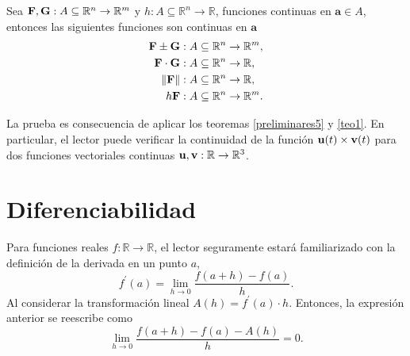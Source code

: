 \begin{teorema}
  Sea $\mathbf{F},\mathbf{G}:A\subseteq \mathbb{R}^n\to \mathbb{R}^m$ y $h:A\subseteq \mathbb{R}^n\to \mathbb{R}$,
  funciones continuas en $\mathbf{a}\in A$, entonces las siguientes funciones son continuas en $\mathbf{a}$
  \begin{align*}
    \mathbf{F}\pm \mathbf{G}:A\subseteq \mathbb{R}^n &\to \mathbb{R}^m, \\
    \mathbf{F}\cdot \mathbf{G}:A\subseteq \mathbb{R}^n &\to \mathbb{R},\\
    \left\Vert  \mathbf{F}\right\Vert :A\subseteq \mathbb{R}^n &\to \mathbb{R},\\
    h\mathbf{F}:A\subseteq \mathbb{R}^n &\to \mathbb{R}^m.
  \end{align*}
\end{teorema}
La prueba es consecuencia de aplicar los teoremas \ref{preliminares5} y \ref{teo1}.
En particular, el lector puede verificar la continuidad de la función ${\bf u}(t) \times {\bf v}(t)$ para dos funciones vectoriales continuas
${\bf u}, {\bf v}: \mathbb{R}\to \mathbb{R}^3$.

\section{Diferenciabilidad} \label{diferencibilidad}
Para funciones reales $f:\mathbb{R}\rightarrow \mathbb{R}$, el lector seguramente
estará familiarizado con la definición de la derivada en un punto $a$,
\[f^{\prime}(a) =\lim_{h\rightarrow 0}\frac{f(a+h)-f(a) }{h}.\]
Al considerar la transformación lineal $A(h)=f^{\prime}(a)\cdot h$.
Entonces, la expresión anterior se reescribe como
\[\lim_{h\rightarrow 0}\frac{f\left( a+h\right) -f\left( a\right) -A\left( h\right) }{h}=0.\]

